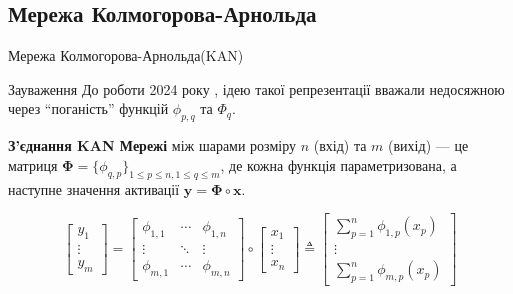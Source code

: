 \documentclass{zkdl-presentation-template}
\begin{document}
    \subsection{Мережа Колмогорова-Арнольда}
    \begin{frame}{Мережа Колмогорова-Арнольда(KAN)}
        \begin{block}{Зауваження}
            До роботи 2024 року \cite{kan}, ідею такої репрезентації вважали недосяжною через
            ``поганість'' функцій $\phi_{p,q}$ та $\Phi_q$. \pause
        \end{block}

        \begin{definition}
            \textbf{З'єднання KAN Мережі} між шарами розміру $n$ (вхід)
            та $m$ (вихід) --- це матриця $\boldsymbol{\Phi} = \{\phi_{q,p}\}_{1 \leq p \leq n, 1 \leq q \leq m}$, де 
            кожна функція параметризована, а наступне значення активації $\boldsymbol{y} = \boldsymbol{\Phi} \circ \boldsymbol{x}$.
        \end{definition}

        \begin{equation*}
            \begin{bmatrix}
                y_1 \\
                \vdots \\
                y_{m}
            \end{bmatrix} =
            \begin{bmatrix}
                \phi_{1,1} & \cdots & \phi_{1,n} \\
                \vdots & \ddots & \vdots \\
                \phi_{m,1} & \cdots & \phi_{m,n}
            \end{bmatrix}\circ \begin{bmatrix}
                x_1 \\
                \vdots \\
                x_n
            \end{bmatrix} \triangleq \begin{bmatrix}
                \sum_{p=1}^n \phi_{1,p}(x_p) \\
                \vdots \\
                \sum_{p=1}^n \phi_{m,p}(x_p)
            \end{bmatrix}
        \end{equation*}
    \end{frame}
\end{document}

